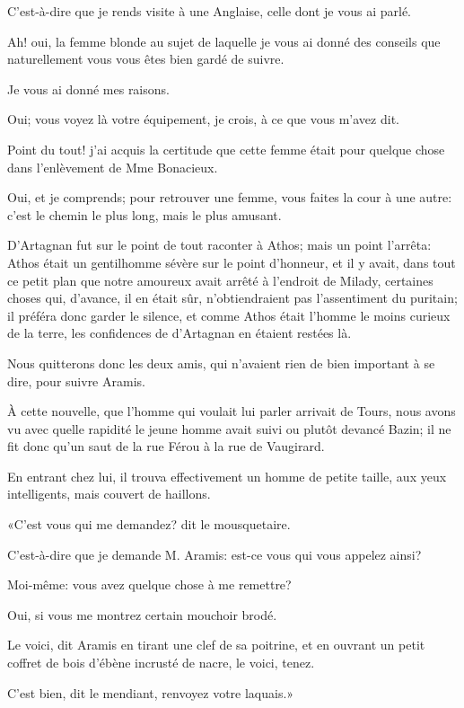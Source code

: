 \speak  C'est-à-dire que je rends visite à une Anglaise, celle dont je vous ai parlé. 

\speak  Ah! oui, la femme blonde au sujet de laquelle je vous ai donné des conseils que naturellement vous vous êtes bien gardé de suivre. 

\speak  Je vous ai donné mes raisons. 

\speak  Oui; vous voyez là votre équipement, je crois, à ce que vous m'avez dit. 

\speak  Point du tout! j'ai acquis la certitude que cette femme était pour quelque chose dans l'enlèvement de Mme Bonacieux. 

\speak  Oui, et je comprends; pour retrouver une femme, vous faites la cour à une autre: c'est le chemin le plus long, mais le plus amusant. 

D'Artagnan fut sur le point de tout raconter à Athos; mais un point l'arrêta: Athos était un gentilhomme sévère sur le point d'honneur, et il y avait, dans tout ce petit plan que notre amoureux avait arrêté à l'endroit de Milady, certaines choses qui, d'avance, il en était sûr, n'obtiendraient pas l'assentiment du puritain; il préféra donc garder le silence, et comme Athos était l'homme le moins curieux de la terre, les confidences de d'Artagnan en étaient restées là. 

Nous quitterons donc les deux amis, qui n'avaient rien de bien important à se dire, pour suivre Aramis. 

À cette nouvelle, que l'homme qui voulait lui parler arrivait de Tours, nous avons vu avec quelle rapidité le jeune homme avait suivi ou plutôt devancé Bazin; il ne fit donc qu'un saut de la rue Férou à la rue de Vaugirard. 

En entrant chez lui, il trouva effectivement un homme de petite taille, aux yeux intelligents, mais couvert de haillons. 

«C'est vous qui me demandez? dit le mousquetaire. 

\speak  C'est-à-dire que je demande M. Aramis: est-ce vous qui vous appelez ainsi? 

\speak  Moi-même: vous avez quelque chose à me remettre? 

\speak  Oui, si vous me montrez certain mouchoir brodé. 

\speak  Le voici, dit Aramis en tirant une clef de sa poitrine, et en ouvrant un petit coffret de bois d'ébène incrusté de nacre, le voici, tenez. 

\speak  C'est bien, dit le mendiant, renvoyez votre laquais.» 

